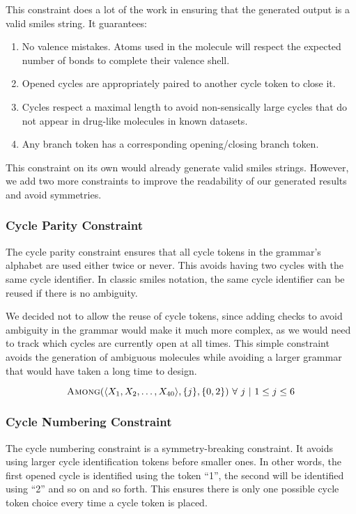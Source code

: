 \documentclass[../Document.tex]{subfiles}
\begin{document}
This constraint does a lot of the work in ensuring that the generated output is a valid \gls{smiles} string. It guarantees:
\begin{enumerate}
    \item No valence mistakes. Atoms used in the molecule will respect the expected number of bonds to complete their valence shell.
    \item Opened cycles are appropriately paired to another cycle token to close it.
    \item Cycles respect a maximal length to avoid non-sensically large cycles that do not appear in drug-like molecules in known datasets.
    \item Any branch token has a corresponding opening/closing branch token.
\end{enumerate}

This constraint on its own would already generate valid \gls{smiles} strings. However, we add two more constraints to improve the readability of our generated results and avoid symmetries.

\subsubsection{Cycle Parity Constraint}
The cycle parity constraint ensures that all cycle tokens in the grammar's alphabet are used either twice or never. This avoids having two cycles with the same cycle identifier. In classic \gls{smiles} notation, the same cycle identifier can be reused if there is no ambiguity.

We decided not to allow the reuse of cycle tokens, since adding checks to avoid ambiguity in the grammar would make it much more complex, as we would need to track which cycles are currently open at all times. This simple constraint avoids the generation of ambiguous molecules while avoiding a larger grammar that would have taken a long time to design.

$$
    \mbox{\sc Among}(\langle X_1, X_2, \ldots, X_{40} \rangle, \{j\}, \{0,2\})\ \forall\ j\ \vert\ 1 \leq j \leq 6
$$

\subsubsection{Cycle Numbering Constraint}
\label{sec:cycle-numbering-constraint}
The cycle numbering constraint is a symmetry-breaking constraint. It avoids using larger cycle identification tokens before smaller ones. In other words, the first opened cycle is identified using the token ``1'', the second will be identified using ``2'' and so on and so forth.
This ensures there is only one possible cycle token choice every time a cycle token is placed.
\end{document}

